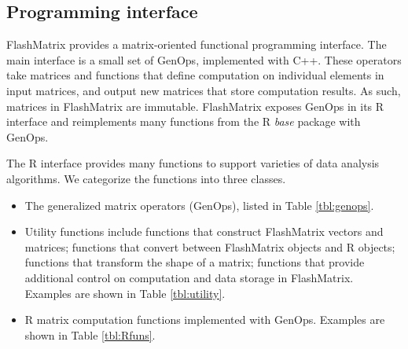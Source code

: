 \subsection{Programming interface}

FlashMatrix provides a matrix-oriented functional programming interface.
The main interface is a small set of GenOps, implemented with C++. These
operators take matrices and
functions that define computation on individual elements in input matrices,
and output new matrices that store computation results. As such, matrices in
FlashMatrix are immutable. FlashMatrix exposes
GenOps in its R interface and reimplements many functions from the R
\textit{base} package with GenOps.

The R interface provides many functions to support varieties of data analysis
algorithms. We categorize the functions into three classes.
\begin{itemize}
	\item The generalized matrix operators (GenOps), listed in Table
		\ref{tbl:genops}.
	\item Utility functions include functions that construct FlashMatrix vectors
		and matrices; functions that convert between FlashMatrix objects and R
		objects; functions that transform the shape of a matrix; functions that
		provide additional control on computation and data storage in FlashMatrix.
		Examples are shown in Table \ref{tbl:utility}.
	\item R matrix computation functions implemented with GenOps. Examples
		are shown in Table \ref{tbl:Rfuns}.
\end{itemize}


